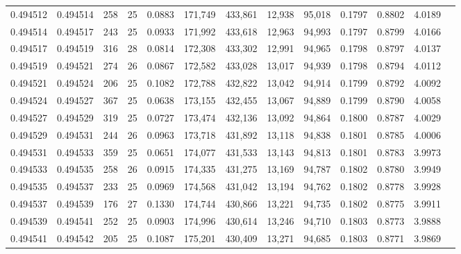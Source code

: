 \begin{tabular}{rrrrrrrrrrrrr}
0.494512 & 0.494514 & 258 &  25 &                                     0.0883 & 171,749 & 433,861 &  12,938 &  95,018 & 0.1797 & 0.8802 & 4.0189 \\
0.494514 & 0.494517 & 243 &  25 &                                     0.0933 & 171,992 & 433,618 &  12,963 &  94,993 & 0.1797 & 0.8799 & 4.0166 \\
0.494517 & 0.494519 & 316 &  28 &                                     0.0814 & 172,308 & 433,302 &  12,991 &  94,965 & 0.1798 & 0.8797 & 4.0137 \\
0.494519 & 0.494521 & 274 &  26 &                                     0.0867 & 172,582 & 433,028 &  13,017 &  94,939 & 0.1798 & 0.8794 & 4.0112 \\
0.494521 & 0.494524 & 206 &  25 &                                     0.1082 & 172,788 & 432,822 &  13,042 &  94,914 & 0.1799 & 0.8792 & 4.0092 \\
0.494524 & 0.494527 & 367 &  25 &                                     0.0638 & 173,155 & 432,455 &  13,067 &  94,889 & 0.1799 & 0.8790 & 4.0058 \\
0.494527 & 0.494529 & 319 &  25 &                                     0.0727 & 173,474 & 432,136 &  13,092 &  94,864 & 0.1800 & 0.8787 & 4.0029 \\
0.494529 & 0.494531 & 244 &  26 &                                     0.0963 & 173,718 & 431,892 &  13,118 &  94,838 & 0.1801 & 0.8785 & 4.0006 \\
0.494531 & 0.494533 & 359 &  25 &                                     0.0651 & 174,077 & 431,533 &  13,143 &  94,813 & 0.1801 & 0.8783 & 3.9973 \\
0.494533 & 0.494535 & 258 &  26 &                                     0.0915 & 174,335 & 431,275 &  13,169 &  94,787 & 0.1802 & 0.8780 & 3.9949 \\
0.494535 & 0.494537 & 233 &  25 &                                     0.0969 & 174,568 & 431,042 &  13,194 &  94,762 & 0.1802 & 0.8778 & 3.9928 \\
0.494537 & 0.494539 & 176 &  27 &                                     0.1330 & 174,744 & 430,866 &  13,221 &  94,735 & 0.1802 & 0.8775 & 3.9911 \\
0.494539 & 0.494541 & 252 &  25 &                                     0.0903 & 174,996 & 430,614 &  13,246 &  94,710 & 0.1803 & 0.8773 & 3.9888 \\
0.494541 & 0.494542 & 205 &  25 &                                     0.1087 & 175,201 & 430,409 &  13,271 &  94,685 & 0.1803 & 0.8771 & 3.9869 \\

\end{tabular}
